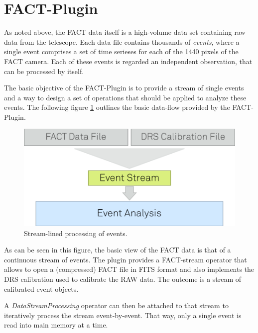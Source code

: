 \section{\label{sec:concept}FACT-Plugin}
As noted above, the FACT data itself is a high-volume data set
containing raw data from the telescope. Each data file contains
thousands of {\em events}, where a single event comprises a set of
time serieses for each of the 1440 pixels of the FACT camera. Each of
these events is regarded an independent observation, that can be
processed by itself.

The basic objective of the FACT-Plugin is to provide a stream of
single events and a way to design a set of operations that should be
applied to analyze these events. The following figure
\ref{fig:eventStream} outlines the basic data-flow provided by the
FACT-Plugin.

\begin{figure}[h!]
\begin{center}
\includegraphics[scale=0.25]{fact-event-stream}
\end{center}
\caption{\label{fig:eventStream}Stream-lined processing of events.}
\end{figure}

As can be seen in this figure, the basic view of the FACT data is that
of a continuous stream of events. The plugin provides a FACT-stream
operator that allows to open a (compressed) FACT file in FITS format
and also implements the DRS calibration used to calibrate the RAW
data. The outcome is a stream of calibrated event objects.

A {\em DataStreamProcessing} operator can then be attached to that
stream to iteratively process the stream event-by-event. That way,
only a single event is read into main memory at a time.



